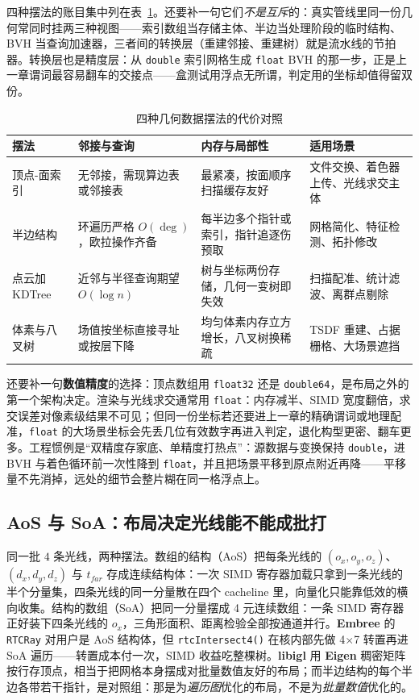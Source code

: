 \documentclass[12pt,a4paper,fontset=fandol]{ctexbook}
\newcommand{\Fn}[1]{\texttt{#1()}}
\newcommand{\Tp}[1]{\texttt{#1}}
\newcommand{\Lib}[1]{\textbf{#1}}
\begin{document}
四种摆法的账目集中列在表~\ref{tab:ch09-layouts}。还要补一句它们\emph{不是互斥}的：真实管线里同一份几何常同时挂两三种视图——索引数组当存储主体、半边当处理阶段的临时结构、BVH 当查询加速器，三者间的转换层（重建邻接、重建树）就是流水线的节拍器。转换层也是精度层：从 \Tp{double} 索引网格生成 \Tp{float} BVH 的那一步，正是上一章谓词最容易翻车的交接点——盒测试用浮点无所谓，判定用的坐标却值得留双份。

\begin{table}[H]
\centering
\caption{四种几何数据摆法的代价对照}
\label{tab:ch09-layouts}
\small
\begin{tabular}{@{}>{\raggedright\arraybackslash}p{}
  >{\raggedright\arraybackslash}p{}
  >{\raggedright\arraybackslash}p{}
  >{\raggedright\arraybackslash}p{}@{}}
\toprule
摆法 & 邻接与查询 & 内存与局部性 & 适用场景 \\
\midrule
顶点-面索引 & 无邻接，需现算边表或邻接表 &
  最紧凑，按面顺序扫描缓存友好 &
  文件交换、着色器上传、光线求交主体 \\
半边结构 & 环遍历严格 $O(\deg)$，欧拉操作齐备 &
  每半边多个指针或索引，指针追逐伤预取 &
  网格简化、特征检测、拓扑修改 \\
点云加 KDTree & 近邻与半径查询期望 $O(\log n)$ &
  树与坐标两份存储，几何一变树即失效 &
  扫描配准、统计滤波、离群点剔除 \\
体素与八叉树 & 场值按坐标直接寻址或按层下降 &
  均匀体素内存立方增长，八叉树换稀疏 &
  TSDF 重建、占据栅格、大场景遮挡 \\
\bottomrule
\end{tabular}
\end{table}

还要补一句\textbf{数值精度}的选择：顶点数组用 \Tp{float32} 还是 \Tp{double64}，是布局之外的第一个架构决定。渲染与光线求交通常用 \Tp{float}：内存减半、SIMD 宽度翻倍，求交误差对像素级结果不可见；但同一份坐标若还要进上一章的精确谓词或地理配准，\Tp{float} 的大场景坐标会先丢几位有效数字再进入判定，退化构型更密、翻车更多。工程惯例是``双精度存家底、单精度打热点''：源数据与变换保持 \Tp{double}，进 BVH 与着色循环前一次性降到 \Tp{float}，并且把场景平移到原点附近再降——平移量不先消掉，远处的细节会整片糊在同一格浮点上。

\subsection{AoS 与 SoA：布局决定光线能不能成批打}

同一批 $4$ 条光线，两种摆法。数组的结构（AoS）把每条光线的 $(o_x,o_y,o_z)$、$(d_x,d_y,d_z)$ 与 $t_{far}$ 存成连续结构体：一次 SIMD 寄存器加载只拿到一条光线的半个分量集，四条光线的同一分量散在四个 cacheline 里，向量化只能靠低效的横向收集。结构的数组（SoA）把同一分量摆成 4 元连续数组：一条 SIMD 寄存器正好装下四条光线的 $o_x$，三角形面积、距离检验全部按通道并行。\Lib{Embree} 的 \Tp{RTCRay} 对用户是 AoS 结构体，但 \Fn{rtcIntersect4} 在核内部先做 4$\times$7 转置再进 SoA 遍历——转置成本付一次，SIMD 收益吃整棵树。\Lib{libigl} 用 \Lib{Eigen} 稠密矩阵按行存顶点，相当于把网格本身摆成对批量数值友好的布局；而半边结构的每个半边各带若干指针，是对照组：那是为\emph{遍历图}优化的布局，不是为\emph{批量数值}优化的。
\end{document}
